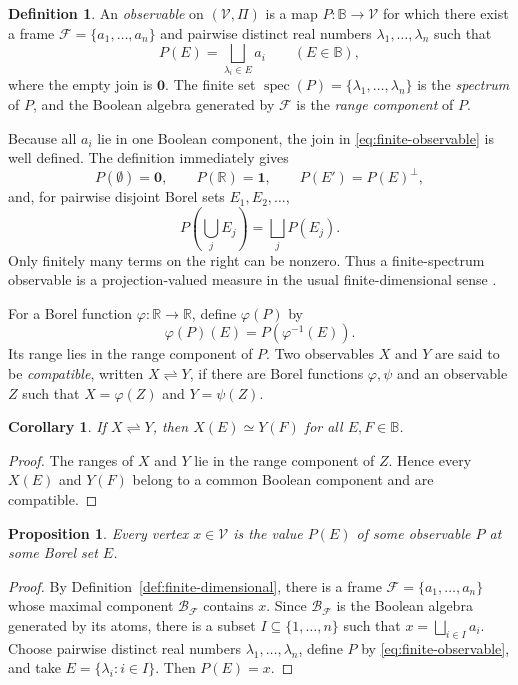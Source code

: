 \documentclass{article}   	%
\theoremstyle{plain}
\newtheorem{proposition}[theorem]{Proposition}
\newtheorem{corollary}[theorem]{Corollary}
\theoremstyle{definition}
\newtheorem{definition}[theorem]{Definition}
\theoremstyle{remark}
\DeclareMathOperator{\spec}{spec}
\begin{document}
\begin{definition}
\label{def:obs}
An \emph{observable} on $(\mathcal V,\Pi)$ is a map
$P:\mathbb B\to\mathcal V$ for which there exist a frame
$\mathcal F=\{a_1,\dots,a_n\}$ and pairwise distinct real numbers
$\lambda_1,\dots,\lambda_n$ such that
\begin{equation}
\label{eq:finite-observable}
 P(E)=\bigsqcup_{\lambda_i\in E} a_i
 \qquad (E\in\mathbb B),
\end{equation}
where the empty join is $\mathbf 0$.
The finite set
$\spec(P)=\{\lambda_1,\dots,\lambda_n\}$ is the
\emph{spectrum} of $P$, and the Boolean algebra generated by
$\mathcal F$ is the \emph{range component} of $P$.
\end{definition}

Because all $a_i$ lie in one Boolean component, the join in
\eqref{eq:finite-observable} is well defined.  The definition immediately gives
\[
P(\emptyset)=\mathbf 0,
\qquad P(\mathbb R)=\mathbf 1,
\qquad P(E')=P(E)^\perp,
\]
and, for pairwise disjoint Borel sets $E_1,E_2,\dots$,
\[
P\!\left(\bigcup_jE_j\right)=\bigsqcup_jP(E_j).
\]
Only finitely many terms on the right can be nonzero.  Thus a finite-spectrum
observable is a projection-valued measure in the usual finite-dimensional
sense \cite{Varadarajan}.

For a Borel function $\varphi:\mathbb R\to\mathbb R$, define
$\varphi(P)$ by
\[
\varphi(P)(E)=P(\varphi^{-1}(E)).
\]
Its range lies in the range component of $P$.
Two observables $X$ and $Y$ are said to be \emph{compatible}, written
$X\rightleftharpoons Y$, if there are Borel functions $\varphi,\psi$ and an
observable $Z$ such that $X=\varphi(Z)$ and $Y=\psi(Z)$.

\begin{corollary}
\label{cor:comobs}
If $X\rightleftharpoons Y$, then $X(E)\simeq Y(F)$ for all
$E,F\in\mathbb B$.
\end{corollary}

\begin{proof}
The ranges of $X$ and $Y$ lie in the range component of $Z$.  Hence every
$X(E)$ and $Y(F)$ belong to a common Boolean component and are compatible.
\end{proof}

\begin{proposition}
\label{prop:vertex-as-event}
Every vertex $x\in\mathcal V$ is the value $P(E)$ of some observable $P$ at
some Borel set $E$.
\end{proposition}

\begin{proof}
By Definition~\ref{def:finite-dimensional}, there is a frame
$\mathcal F=\{a_1,\dots,a_n\}$ whose maximal component
$\mathcal B_{\mathcal F}$ contains $x$.  Since
$\mathcal B_{\mathcal F}$ is the Boolean algebra generated by its atoms,
there is a subset $I\subseteq\{1,\dots,n\}$ such that
$x=\bigsqcup_{i\in I}a_i$.  Choose pairwise distinct real numbers
$\lambda_1,\dots,\lambda_n$, define $P$ by
\eqref{eq:finite-observable}, and take
$E=\{\lambda_i:i\in I\}$.  Then $P(E)=x$.
\end{proof}
\end{document}
